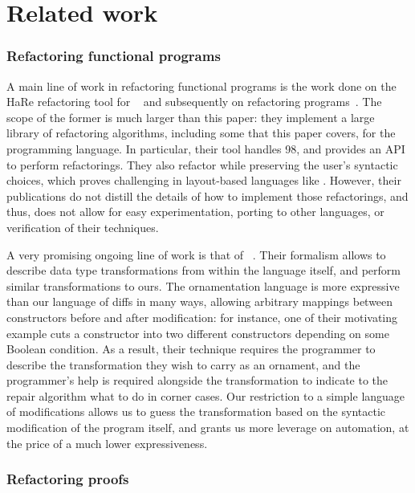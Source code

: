 \chapter{Related work}

\subsection*{Refactoring functional programs}

A main line of work in refactoring functional programs is the work done on the
HaRe refactoring tool for \Haskell{}~\citep{li2005haskell} and subsequently on
refactoring \Erlang{} programs~\citep{li2006}.  The scope of the former is much
larger than this paper: they implement a large library of refactoring
algorithms, including some that this paper covers, for the \Haskell{}
programming language.  In particular, their tool handles \Haskell{} 98, and
provides an API to perform refactorings.  They also refactor while preserving
the user's syntactic choices, which proves challenging in layout-based languages
like \Haskell{}.  However, their publications do not distill the details of how
to implement those refactorings, and thus, does not allow for easy
experimentation, porting to other languages, or verification of their
techniques.

A very promising ongoing line of work is that of
~\citep{williams2017}.  Their formalism allows to describe
data type transformations from within the language itself, and perform similar
transformations to ours.  The ornamentation language is more expressive than our
language of diffs in many ways, allowing arbitrary mappings between constructors
before and after modification: for instance, one of their motivating example
cuts a constructor into two different constructors depending on some Boolean
condition.  As a result, their technique requires the programmer to describe the
transformation they wish to carry as an ornament, and the programmer's help is
required alongside the transformation to indicate to the repair algorithm what
to do in corner cases.  Our restriction to a simple language of modifications
allows us to guess the transformation based on the syntactic modification of the
program itself, and grants us more leverage on automation, at the price of a
much lower expressiveness.

\subsection*{Refactoring proofs}

